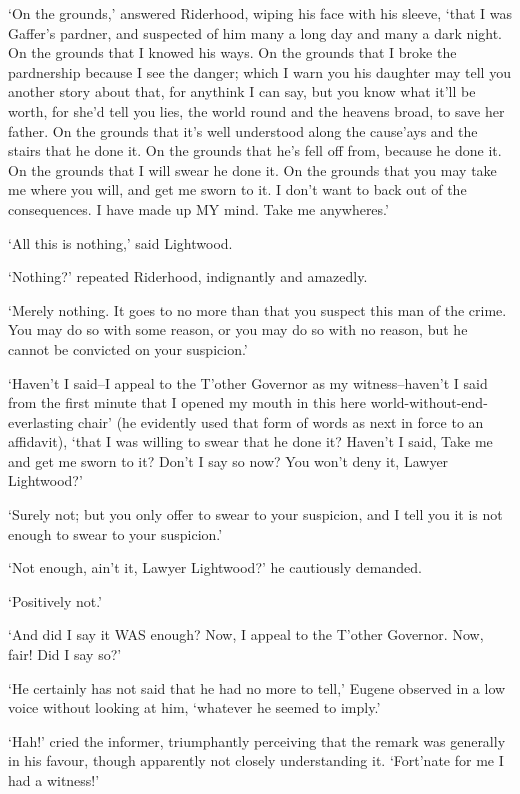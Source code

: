 ‘On the grounds,’ answered Riderhood, wiping his face with his sleeve,
‘that I was Gaffer’s pardner, and suspected of him many a long day and
many a dark night. On the grounds that I knowed his ways. On the grounds
that I broke the pardnership because I see the danger; which I warn you
his daughter may tell you another story about that, for anythink I can
say, but you know what it’ll be worth, for she’d tell you lies, the
world round and the heavens broad, to save her father. On the grounds
that it’s well understood along the cause’ays and the stairs that he
done it. On the grounds that he’s fell off from, because he done it. On
the grounds that I will swear he done it. On the grounds that you may
take me where you will, and get me sworn to it. I don’t want to back out
of the consequences. I have made up MY mind. Take me anywheres.’

‘All this is nothing,’ said Lightwood.

‘Nothing?’ repeated Riderhood, indignantly and amazedly.

‘Merely nothing. It goes to no more than that you suspect this man of
the crime. You may do so with some reason, or you may do so with no
reason, but he cannot be convicted on your suspicion.’

‘Haven’t I said--I appeal to the T’other Governor as my witness--haven’t
I said from the first minute that I opened my mouth in this here
world-without-end-everlasting chair’ (he evidently used that form of
words as next in force to an affidavit), ‘that I was willing to swear
that he done it? Haven’t I said, Take me and get me sworn to it? Don’t I
say so now? You won’t deny it, Lawyer Lightwood?’

‘Surely not; but you only offer to swear to your suspicion, and I tell
you it is not enough to swear to your suspicion.’

‘Not enough, ain’t it, Lawyer Lightwood?’ he cautiously demanded.

‘Positively not.’

‘And did I say it WAS enough? Now, I appeal to the T’other Governor.
Now, fair! Did I say so?’

‘He certainly has not said that he had no more to tell,’ Eugene observed
in a low voice without looking at him, ‘whatever he seemed to imply.’

‘Hah!’ cried the informer, triumphantly perceiving that the remark was
generally in his favour, though apparently not closely understanding it.
‘Fort’nate for me I had a witness!’

